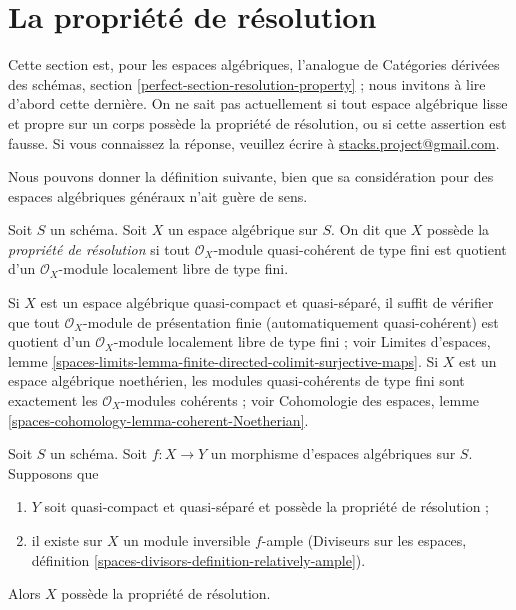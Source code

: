 \section{La propri\'et\'e de r\'esolution}
\label{section-resolution-property}

\noindent
Cette section est, pour les espaces alg\'ebriques, l'analogue de Cat\'egories
d\'eriv\'ees des sch\'emas, section
\ref{perfect-section-resolution-property} ; nous invitons \`a lire d'abord
cette derni\`ere. On ne sait pas actuellement si tout espace alg\'ebrique lisse
et propre sur un corps poss\`ede la propri\'et\'e de r\'esolution, ou si cette
assertion est fausse. Si vous connaissez la r\'eponse, veuillez \'ecrire \`a
\href{mailto:stacks.project@gmail.com}{stacks.project@gmail.com}.

\medskip\noindent
Nous pouvons donner la d\'efinition suivante, bien que sa consid\'eration pour
des espaces alg\'ebriques g\'en\'eraux n'ait gu\`ere de sens.

\begin{definition}
\label{definition-resolution-property}
Soit $S$ un sch\'ema. Soit $X$ un espace alg\'ebrique sur $S$.
On dit que $X$ poss\`ede la {\it propri\'et\'e de r\'esolution} si tout
$\mathcal{O}_X$-module quasi-coh\'erent de type fini est quotient d'un
$\mathcal{O}_X$-module localement libre de type fini.
\end{definition}

\noindent
Si $X$ est un espace alg\'ebrique quasi-compact et quasi-s\'epar\'e, il suffit de
v\'erifier que tout $\mathcal{O}_X$-module de pr\'esentation finie
(automatiquement quasi-coh\'erent) est quotient d'un $\mathcal{O}_X$-module
localement libre de type fini ; voir Limites d'espaces, lemme
\ref{spaces-limits-lemma-finite-directed-colimit-surjective-maps}.
Si $X$ est un espace alg\'ebrique noeth\'erien, les modules quasi-coh\'erents de
type fini sont exactement les $\mathcal{O}_X$-modules coh\'erents ; voir
Cohomologie des espaces, lemme
\ref{spaces-cohomology-lemma-coherent-Noetherian}.

\begin{lemma}
\label{lemma-resolution-property-ample-relative}
Soit $S$ un sch\'ema.
Soit $f:X\to Y$ un morphisme d'espaces alg\'ebriques sur $S$. Supposons que
\begin{enumerate}
\item $Y$ soit quasi-compact et quasi-s\'epar\'e et poss\`ede la propri\'et\'e de
r\'esolution ;
\item il existe sur $X$ un module inversible $f$-ample (Diviseurs sur les
espaces, d\'efinition
\ref{spaces-divisors-definition-relatively-ample}).
\end{enumerate}
Alors $X$ poss\`ede la propri\'et\'e de r\'esolution.
\end{lemma}

